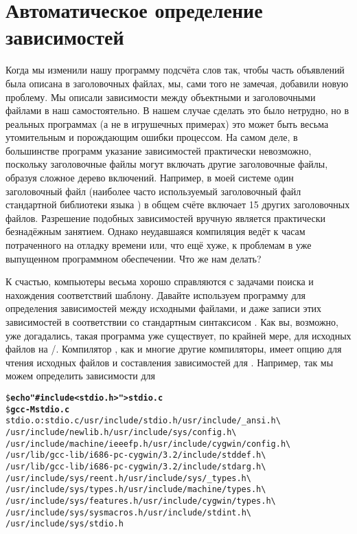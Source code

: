 \section{Автоматическое определение зависимостей}
\label{sec:auto_dep_gen}
Когда мы изменили нашу программу подсчёта слов так, чтобы часть
объявлений была описана в заголовочных файлах, мы, сами того не
замечая, добавили новую проблему. Мы описали зависимости между
объектными и заголовочными файлами в наш \Makefile{} самостоятельно. В
нашем случае сделать это было нетрудно, но в реальных программах (а не
в игрушечных примерах) это может быть весьма утомительным и
порождающим ошибки процессом. На самом деле, в большинстве программ
указание зависимостей практически невозможно, поскольку заголовочные
файлы могут включать другие заголовочные файлы, образуя сложное дерево
включений.
Например, в моей системе один заголовочный файл 
(наиболее часто используемый заголовочный файл стандартной библиотеки
языка \Clang{}) в общем счёте включает 15 других заголовочных файлов.
Разрешение подобных зависимостей вручную является практически
безнадёжным занятием. Однако неудавшаяся компиляция ведёт к часам
потраченного на отладку времени или, что ещё хуже, к проблемам в уже
выпущенном программном обеспечении. Что же нам делать?

К счастью, компьютеры весьма хорошо справляются с задачами поиска и
нахождения соответствий шаблону. Давайте используем программу для
определения зависимостей между исходными файлами, и даже записи этих
зависимостей в соответствии со стандартным синтаксисом \GNUmake{}. Как
вы, возможно, уже догадались, такая программа уже существует, по крайней
мере, для исходных файлов на \Clang{}/\Cplusplus{}.
Компилятор , как и многие другие компиляторы, имеет опцию
для чтения исходных файлов и составления зависимостей для \GNUmake{}.
Например, так мы можем определить зависимости для 

\begin{alltt}
\footnotesize
\$ \textbf{echo "#include <stdio.h>" > stdio.c}
\$ \textbf{gcc -M stdio.c}
stdio.o: stdio.c /usr/include/stdio.h /usr/include/\_ansi.h \textbackslash{}
/usr/include/newlib.h /usr/include/sys/config.h \textbackslash{}
/usr/include/machine/ieeefp.h /usr/include/cygwin/config.h \textbackslash{}
/usr/lib/gcc-lib/i686-pc-cygwin/3.2/include/stddef.h \textbackslash{}
/usr/lib/gcc-lib/i686-pc-cygwin/3.2/include/stdarg.h \textbackslash{}
/usr/include/sys/reent.h /usr/include/sys/\_types.h \textbackslash{}
/usr/include/sys/types.h /usr/include/machine/types.h \textbackslash{}
/usr/include/sys/features.h /usr/include/cygwin/types.h \textbackslash{}
/usr/include/sys/sysmacros.h /usr/include/stdint.h \textbackslash{}
/usr/include/sys/stdio.h
\end{alltt}

